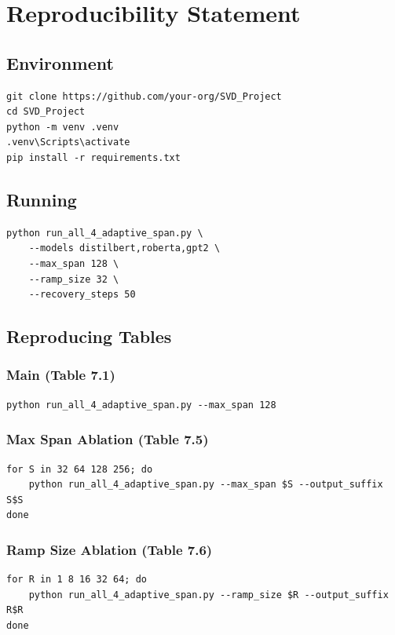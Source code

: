 
\section{Reproducibility Statement}

\subsection{Environment}

\begin{lstlisting}
git clone https://github.com/your-org/SVD_Project
cd SVD_Project
python -m venv .venv
.venv\Scripts\activate
pip install -r requirements.txt
\end{lstlisting}

\subsection{Running}

\begin{lstlisting}
python run_all_4_adaptive_span.py \
    --models distilbert,roberta,gpt2 \
    --max_span 128 \
    --ramp_size 32 \
    --recovery_steps 50
\end{lstlisting}

\subsection{Reproducing Tables}

\subsubsection{Main (Table 7.1)}
\begin{lstlisting}
python run_all_4_adaptive_span.py --max_span 128
\end{lstlisting}

\subsubsection{Max Span Ablation (Table 7.5)}
\begin{lstlisting}
for S in 32 64 128 256; do
    python run_all_4_adaptive_span.py --max_span $S --output_suffix S$S
done
\end{lstlisting}

\subsubsection{Ramp Size Ablation (Table 7.6)}
\begin{lstlisting}
for R in 1 8 16 32 64; do
    python run_all_4_adaptive_span.py --ramp_size $R --output_suffix R$R
done
\end{lstlisting}

